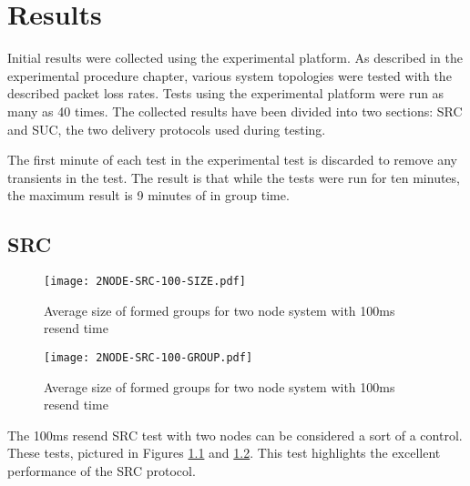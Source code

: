 \chapter{Results}

Initial results were collected using the experimental platform. As described in
the experimental procedure chapter, various system topologies were tested with
the described packet loss rates. Tests using the experimental platform were run
as many as 40 times. The collected results have been divided into two sections:
SRC and SUC, the two delivery protocols used during testing.

The first minute of each test in the experimental test is discarded to remove
any transients in the test. The result is that while the tests were run for
ten minutes, the maximum result is 9 minutes of in group time.

\section{SRC}

\begin{figure}[!h]
\centering
\texttt{[image: 2NODE-SRC-100-SIZE.pdf]}
\caption{Average size of formed groups for two node system with 100ms resend time}
\label{fig:MGS-2NODE-100}
\end{figure}

\begin{figure}[!h]
\centering
\texttt{[image: 2NODE-SRC-100-GROUP.pdf]}
\caption{Average size of formed groups for two node system with 100ms resend time}
\label{fig:IGT-2NODE-100}
\end{figure}

The 100ms resend SRC test with two nodes can be considered a sort of a control.
These tests, pictured in Figures \ref{fig:MGS-2NODE-100} and
\ref{fig:IGT-2NODE-100}. This test highlights the excellent performance of the
SRC protocol.
